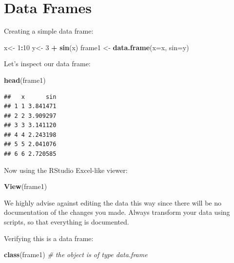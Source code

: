 \documentclass[]{book}
\newenvironment{Shaded}{\begin{snugshade}}{\end{snugshade}}
\newcommand{\CommentTok}[1]{\textcolor[rgb]{0.56,0.35,0.01}{\textit{#1}}}
\newcommand{\DataTypeTok}[1]{\textcolor[rgb]{0.13,0.29,0.53}{#1}}
\newcommand{\DecValTok}[1]{\textcolor[rgb]{0.00,0.00,0.81}{#1}}
\newcommand{\KeywordTok}[1]{\textcolor[rgb]{0.13,0.29,0.53}{\textbf{#1}}}
\newcommand{\NormalTok}[1]{#1}
\newcommand{\OperatorTok}[1]{\textcolor[rgb]{0.81,0.36,0.00}{\textbf{#1}}}
\newcommand{\StringTok}[1]{\textcolor[rgb]{0.31,0.60,0.02}{#1}}
\theoremstyle{definition}
\theoremstyle{definition}
\theoremstyle{definition}
\theoremstyle{remark}
\begin{document}
\hypertarget{data-frames}{%
\section{Data Frames}\label{data-frames}}

Creating a simple data frame:

\begin{Shaded}
\begin{Highlighting}[]
\NormalTok{x<-}\StringTok{ }\DecValTok{1}\OperatorTok{:}\DecValTok{10}
\NormalTok{y<-}\StringTok{ }\DecValTok{3} \OperatorTok{+}\StringTok{ }\KeywordTok{sin}\NormalTok{(x) }
\NormalTok{frame1 <-}\StringTok{ }\KeywordTok{data.frame}\NormalTok{(}\DataTypeTok{x=}\NormalTok{x, }\DataTypeTok{sin=}\NormalTok{y)    }
\end{Highlighting}
\end{Shaded}

Let's inspect our data frame:

\begin{Shaded}
\begin{Highlighting}[]
\KeywordTok{head}\NormalTok{(frame1)}
\end{Highlighting}
\end{Shaded}

\begin{verbatim}
##   x      sin
## 1 1 3.841471
## 2 2 3.909297
## 3 3 3.141120
## 4 4 2.243198
## 5 5 2.041076
## 6 6 2.720585
\end{verbatim}

Now using the RStudio Excel-like viewer:

\begin{Shaded}
\begin{Highlighting}[]
\KeywordTok{View}\NormalTok{(frame1) }
\end{Highlighting}
\end{Shaded}

We highly advise against editing the data this way since there will be no documentation of the changes you made.
Always transform your data using scripts, so that everything is documented.

Verifying this is a data frame:

\begin{Shaded}
\begin{Highlighting}[]
\KeywordTok{class}\NormalTok{(frame1) }\CommentTok{# the object is of type data.frame}
\end{Highlighting}
\end{Shaded}
\end{document}
